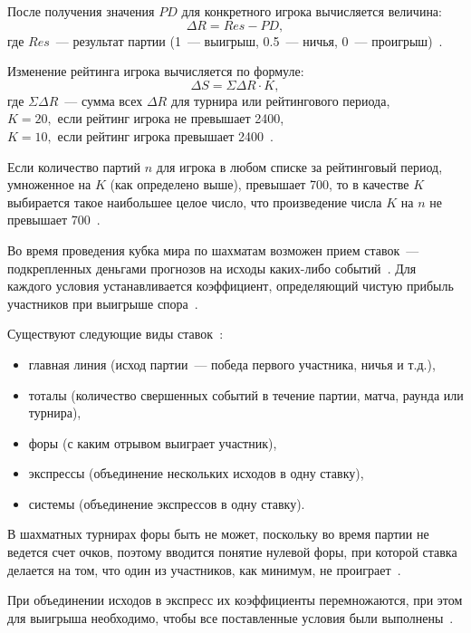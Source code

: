 После получения значения $PD$ для конкретного игрока вычисляется величина:
\begin{equation}\label{dr}
	\Delta{R} = Res - PD,
\end{equation}
где $Res$~--- результат партии (1~--- выигрыш, 0.5~--- ничья, 0~--- проигрыш)~\cite{fideraiting}.

Изменение рейтинга игрока вычисляется по формуле:
\begin{equation}\label{raitingdelta}
	\Delta{S} = \Sigma{\Delta{R}} \cdot K,
\end{equation}
где $\Sigma{\Delta{R}}$~--- сумма всех $\Delta{R}$ для турнира или рейтингового периода,\\
\text{~~~~~~}$K = 20,$ если рейтинг игрока не превышает 2400,\\
\text{~~~~~~}$K = 10,$ если рейтинг игрока превышает 2400~\cite{fideraiting}.

Если количество партий $n$ для игрока в любом списке за рейтинговый период, умноженное на $K$ (как определено выше), превышает 700, то в качестве $K$ выбирается такое наибольшее целое число, что произведение числа $K$ на $n$ не превышает 700~\cite{fideraiting}.

Во время проведения кубка мира по шахматам возможен прием ставок~--- подкрепленных деньгами прогнозов на исходы каких-либо событий~\cite{bet}.
Для каждого условия устанавливается коэффициент, определяющий чистую прибыль участников при выигрыше спора~\cite{bet}.

Существуют следующие виды ставок~\cite{bet}:
\begin{itemize}
	\item главная линия (исход партии~--- победа первого участника, ничья и т.д.),
	\item тоталы (количество свершенных событий в течение партии, матча, раунда или турнира),
	\item форы (с каким отрывом выиграет участник),
	\item экспрессы (объединение нескольких исходов в одну ставку),
	\item системы (объединение экспрессов в одну ставку).
\end{itemize}

В шахматных турнирах форы быть не может, поскольку во время партии не ведется счет очков, поэтому вводится понятие нулевой форы, при которой ставка делается на том, что один из участников, как минимум, не проиграет~\cite{chessbet}.

При объединении исходов в экспресс их коэффициенты перемножаются, при этом для выигрыша необходимо, чтобы все поставленные условия были выполнены~\cite{bet}.

